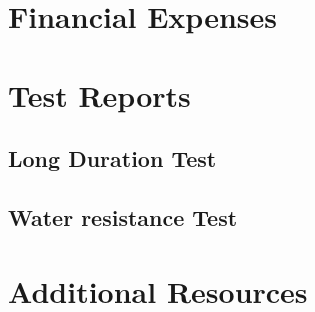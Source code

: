 \section{Financial Expenses} \label{Financial Expenses}
\newpage

\section{Test Reports} \label{Test Reports}
\newpage

\subsection{Long Duration Test} \label{Long Duration Test}
\newpage

\subsection{Water resistance Test} \label{Water resistance Test}
\newpage

\section{Additional Resources} \label{Additional Resources}
\newpage
